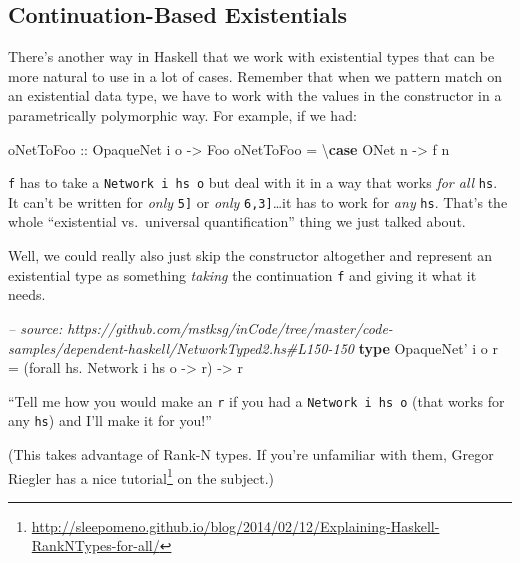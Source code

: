 \documentclass[]{article}
\newenvironment{Shaded}{}{}
\newcommand{\KeywordTok}[1]{\textcolor[rgb]{0.00,0.44,0.13}{\textbf{{#1}}}}
\newcommand{\DataTypeTok}[1]{\textcolor[rgb]{0.56,0.13,0.00}{{#1}}}
\newcommand{\CommentTok}[1]{\textcolor[rgb]{0.38,0.63,0.69}{\textit{{#1}}}}
\newcommand{\OtherTok}[1]{\textcolor[rgb]{0.00,0.44,0.13}{{#1}}}
\newcommand{\FunctionTok}[1]{\textcolor[rgb]{0.02,0.16,0.49}{{#1}}}
\newcommand{\NormalTok}[1]{{#1}}
\renewcommand{\href}[2]{#2\footnote{\url{#1}}}
\begin{document}
\subsection{Continuation-Based
Existentials}\label{continuation-based-existentials}

There's another way in Haskell that we work with existential types that can be
more natural to use in a lot of cases. Remember that when we pattern match on an
existential data type, we have to work with the values in the constructor in a
parametrically polymorphic way. For example, if we had:

\begin{Shaded}
\begin{Highlighting}[]
\OtherTok{oNetToFoo ::} \DataTypeTok{OpaqueNet} \NormalTok{i o }\OtherTok{->} \DataTypeTok{Foo}
\NormalTok{oNetToFoo }\FunctionTok{=} \NormalTok{\textbackslash{}}\KeywordTok{case} \DataTypeTok{ONet} \NormalTok{n }\OtherTok{->} \NormalTok{f n}
\end{Highlighting}
\end{Shaded}

\texttt{f} has to take a \texttt{Network\ i\ hs\ o} but deal with it in a way
that works \emph{for all} \texttt{hs}. It can't be written for \emph{only}
\texttt{\textquotesingle{}{[}5{]}} or \emph{only}
\texttt{\textquotesingle{}{[}6,3{]}}\ldots{}it has to work for \emph{any}
\texttt{hs}. That's the whole ``existential vs.~universal quantification'' thing
we just talked about.

Well, we could really also just skip the constructor altogether and represent an
existential type as something \emph{taking} the continuation \texttt{f} and
giving it what it needs.

\begin{Shaded}
\begin{Highlighting}[]
\CommentTok{-- source: https://github.com/mstksg/inCode/tree/master/code-samples/dependent-haskell/NetworkTyped2.hs#L150-150}
\KeywordTok{type} \DataTypeTok{OpaqueNet'} \NormalTok{i o r }\FunctionTok{=} \NormalTok{(forall hs}\FunctionTok{.} \DataTypeTok{Network} \NormalTok{i hs o }\OtherTok{->} \NormalTok{r) }\OtherTok{->} \NormalTok{r}
\end{Highlighting}
\end{Shaded}

``Tell me how you would make an \texttt{r} if you had a
\texttt{Network\ i\ hs\ o} (that works for any \texttt{hs}) and I'll make it for
you!''

(This takes advantage of Rank-N types. If you're unfamiliar with them, Gregor
Riegler has a
\href{http://sleepomeno.github.io/blog/2014/02/12/Explaining-Haskell-RankNTypes-for-all/}{nice
tutorial} on the subject.)
\end{document}
